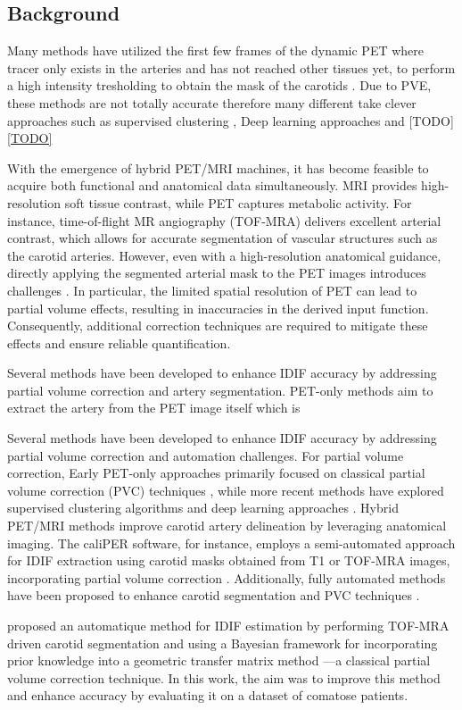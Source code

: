 \subsection{Background}
Many methods have utilized the first few frames of the dynamic PET where tracer only exists in the arteries and has not reached other tissues yet, to perform a high intensity tresholding to obtain the mask of the carotids \cite{young2023image}.
Due to PVE, these methods are not totally accurate therefore many different take clever approaches such as supervised clustering \cite{TODO}, Deep learning approaches \cite{TODO} and [TODO] \ref{TODO}



With the emergence of hybrid PET/MRI machines, it has become feasible to acquire both functional and anatomical data simultaneously.
MRI provides high-resolution soft tissue contrast, while PET captures metabolic activity.
For instance, time-of-flight MR angiography (TOF-MRA) delivers excellent arterial contrast, which allows for accurate segmentation of vascular structures such as the carotid arteries.
However, even with a high-resolution anatomical guidance, directly applying the segmented arterial mask to the PET images introduces challenges \cite{zanotti2011image}.
In particular, the limited spatial resolution of PET can lead to partial volume effects, resulting in inaccuracies in the derived input function.
Consequently, additional correction techniques are required to mitigate these effects and ensure reliable quantification.

Several methods have been developed to enhance IDIF accuracy by addressing partial volume correction and artery segmentation.
PET-only methods aim to extract the artery from the PET image itself which is


Several methods have been developed to enhance IDIF accuracy by addressing partial volume correction and automation challenges.
For partial volume correction,
Early PET-only approaches primarily focused on classical partial volume correction (PVC) techniques \cite{mourik2009image}, while more recent methods have explored supervised clustering algorithms \cite{lyoo2014image} and deep learning approaches \cite{chavan2024end,ferrante2024physically}.
Hybrid PET/MRI methods improve carotid artery delineation by leveraging anatomical imaging. The caliPER software, for instance, employs a semi-automated approach for IDIF extraction using carotid masks obtained from T1 or TOF-MRA images, incorporating partial volume correction \cite{dassanayake2022caliper}.
Additionally, fully automated methods have been proposed to enhance carotid segmentation and PVC techniques \cite{sari2017estimation, jochimsen2016fully, khalighi2018image, sundar2019towards}.

\citeauthor{irace2021bayesian} \cite{irace2021bayesian} proposed an automatique method for IDIF estimation by performing TOF-MRA driven carotid segmentation and using a Bayesian framework for incorporating prior knowledge into a geometric transfer matrix method \cite{rousset1998correction}---a classical partial volume correction technique.
In this work, the aim was to improve this method and enhance accuracy by evaluating it on a dataset of comatose patients.
